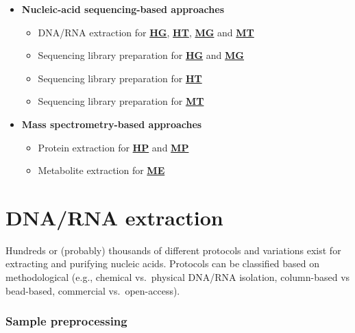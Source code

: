 \documentclass[
]{book}
\providecommand{\tightlist}{%
  \setlength{\itemsep}{0pt}\setlength{\parskip}{0pt}}
\begin{document}
\begin{itemize}
\tightlist
\item
  \textbf{Nucleic-acid sequencing-based approaches}

  \begin{itemize}
  \tightlist
  \item
    DNA/RNA extraction for \textbf{\protect\hyperlink{host-genomics}{HG}}, \textbf{\protect\hyperlink{host-transcriptomics}{HT}}, \textbf{\protect\hyperlink{microbial-metagenomics}{MG}} and \textbf{\protect\hyperlink{microbial-metatranscriptomics}{MT}}
  \item
    Sequencing library preparation for \textbf{\protect\hyperlink{host-genomics}{HG}} and \textbf{\protect\hyperlink{microbial-metagenomics}{MG}}
  \item
    Sequencing library preparation for \textbf{\protect\hyperlink{host-transcriptomics}{HT}}
  \item
    Sequencing library preparation for \textbf{\protect\hyperlink{microbial-metatranscriptomics}{MT}}
  \end{itemize}
\item
  \textbf{Mass spectrometry-based approaches}

  \begin{itemize}
  \tightlist
  \item
    Protein extraction for \textbf{\protect\hyperlink{host-proteomics}{HP}} and \textbf{\protect\hyperlink{microbial-metaproteomics}{MP}}
  \item
    Metabolite extraction for \textbf{\protect\hyperlink{meta-metabolomics}{ME}}
  \end{itemize}
\end{itemize}

\hypertarget{dna-rna-extraction}{%
\chapter{DNA/RNA extraction}\label{dna-rna-extraction}}

Hundreds or (probably) thousands of different protocols and variations exist for extracting and purifying nucleic acids. Protocols can be classified based on methodological (e.g., chemical vs.~physical DNA/RNA isolation, column-based vs bead-based, commercial vs.~open-access).

\hypertarget{sample-preprocessing}{%
\subsection*{Sample preprocessing}\label{sample-preprocessing}}
\end{document}
